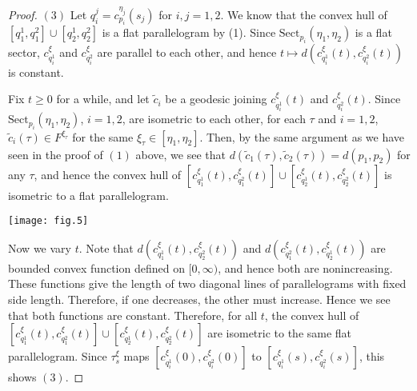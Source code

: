 \documentclass[12pt]{amsart}
\numberwithin{equation}{section}
\theoremstyle{plain}
\theoremstyle{definition}
\theoremstyle{remark}
\newcommand{\cc}[2]{c_{#1}^{#2}}
\newcommand{\trans}[2]{\tau_{#1}^{#2}}
\newcommand{\sect}[3][]{\mathrm{Sect}_{#1}(#2,#3)}
\begin{document}
\begin{proof}
 $(3)$ Let $q_i^j=\cc{p_i}{\eta_j}(s_j)$ for $i,j=1,2$. 
 We know that the convex hull of 
 $[q_1^1, q_1^2] \cup [q_2^1,q_2^2]$ is a flat parallelogram by (1). 
 Since $\sect[p_i]{\eta_1}{\eta_2}$ is a flat sector, 
 $\cc{q_i^1}{\xi}$ and $\cc{q_i^2}{\xi}$ are parallel to each other, and
 hence $t\mapsto d(\cc{q_i^1}{\xi}(t),\cc{q_i^2}{\xi}(t))$ is constant. 

\noindent
\begin{minipage}[c]{6cm}
  Fix $t\geq 0$ for a while, and let $\tilde c_i$ be a geodesic joining
 $\cc{q_i^1}{\xi}(t)$ and $\cc{q_i^2}{\xi}(t)$. 
 Since $\sect[p_i]{\eta_1}{\eta_2}$, $i=1,2$, are isometric to
 each other, for each $\tau$ and $i=1,2$, 
 $\tilde c_i (\tau) \in F^{\xi_{\tau}}$ for the same 
 $\xi_{\tau} \in [\eta_1, \eta_2]$. 
 Then, by the same argument as we have seen in the proof of $(1)$
 above,  we see that 
 $d(\tilde c_1(\tau),\tilde c_2(\tau))=d(p_1,p_2)$ for any $\tau$, 
 and hence the convex hull of 
 $[\cc{q_1^1}{\xi}(t), \cc{q_1^2}{\xi}(t)] \cup
  [\cc{q_2^1}{\xi}(t), \cc{q_2^2}{\xi}(t)]$
 is isometric to a flat parallelogram. 
\end{minipage}
\begin{minipage}[c]{6cm}
 \hspace{5cm}
 \texttt{[image: fig.5]}
\end{minipage}

 Now we vary $t$. 
 Note that $d(\cc{q_1^1}{\xi}(t), \cc{q_2^2}{\xi}(t))$ and 
 $d(\cc{q_1^2}{\xi}(t), \cc{q_2^1}{\xi}(t))$ are bounded convex
 function defined on $[0,\infty)$, and hence both are nonincreasing. 
 These functions give the length of two
 diagonal lines of parallelograms with fixed side length.  Therefore, if
 one decreases, the other must increase.  Hence we see that both
 functions are constant. 
 Therefore, for all $t$,  the convex hull of 
 $[\cc{q_1^1}{\xi}(t), \cc{q_1^2}{\xi}(t)] \cup
  [\cc{q_2^1}{\xi}(t), \cc{q_2^2}{\xi}(t)]$
 are isometric to the same flat parallelogram. 
 Since $\trans{s}{\xi}$ maps 
 $[\cc{q_i^1}{\xi}(0),\cc{q_i^2}{\xi}(0)]$ to
 $[\cc{q_i^1}{\xi}(s), \cc{q_i^2}{\xi}(s)]$, this shows $(3)$.


\end{proof}
\end{document}
